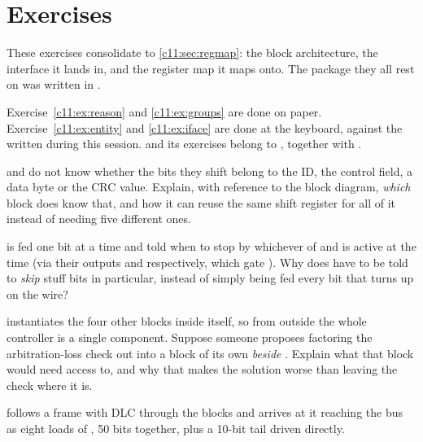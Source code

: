 
\section{Exercises}
\label{c11:sec:exercises}

\begin{aside}
These exercises consolidate  to \ref{c11:sec:regmap}: the block architecture,
the interface it lands in, and the register map it maps onto. The  package they all
rest on was written in .

Exercise~\ref{c11:ex:reason} and \ref{c11:ex:groups} are done on paper. Exercise~\ref{c11:ex:entity}
and \ref{c11:ex:iface} are done at the keyboard, against the
 written during this session.  and its exercises
belong to , together with .
\end{aside}


\label{c11:ex:reason}
  and  do not know whether the bits they shift belong
to the ID, the control field, a data byte or the CRC value. Explain, with reference to the block
diagram, \emph{which} block does know that, and how it can reuse the same shift register for all of
it instead of needing five different ones.

  is fed one bit at a time and told when to stop by whichever of
 and  is active at the time (via their outputs  and
 respectively, which gate ). Why does  have to be
told to \emph{skip} stuff bits in particular, instead of simply being fed every bit that turns up on
the wire?

  instantiates the four other blocks inside itself, so from outside the
whole controller is a single component. Suppose someone proposes factoring the arbitration-loss check
out into a block of its own \emph{beside} . Explain what that block would need
access to, and why that makes the solution worse than leaving the check where it is.

\label{c11:ex:groups}
 follows a frame with DLC  through the blocks and arrives at it
reaching the bus as eight loads of , 50 bits together, plus a 10-bit tail driven
directly.

